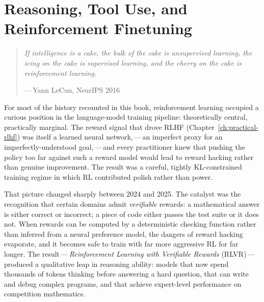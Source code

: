 
\chapter[Reasoning and Reinforcement Finetuning]{Reasoning, Tool Use, and Reinforcement Finetuning}
\label{ch:reasoning}

\begin{quote}
\itshape
If intelligence is a cake, the bulk of the cake is unsupervised learning,
the icing on the cake is supervised learning, and the cherry on the cake
is reinforcement learning.
\par\medskip
\upshape\raggedleft
---\,Yann LeCun, NeurIPS 2016
\end{quote}

\bigskip

For most of the history recounted in this book, reinforcement learning
occupied a curious position in the language-model training pipeline:
theoretically central, practically marginal. The reward signal that
drove RLHF (Chapter~\ref{ch:practical-rlhf}) was itself a
learned neural network,\,---\,an imperfect proxy for an
imperfectly-understood goal,\,---\,and every practitioner knew that pushing the
policy too far against such a reward model would lead to reward
hacking rather than genuine improvement. The result was a careful,
tightly KL-constrained training regime in which RL contributed polish
rather than power.

That picture changed sharply between 2024 and 2025. The catalyst was
the recognition that certain domains admit \emph{verifiable} rewards: a
mathematical answer is either correct or incorrect; a piece of code
either passes the test suite or it does not. When rewards can be
computed by a deterministic checking function rather than inferred from
a neural preference model, the dangers of reward hacking evaporate,
and it becomes safe to train with far more aggressive RL for far longer.
The result\,---\,\emph{Reinforcement Learning with Verifiable
Rewards} (RLVR)\,---\,produced a qualitative leap in
reasoning ability: models that now spend thousands of tokens thinking
before answering a hard question, that can write and debug complex
programs, and that achieve expert-level performance on competition
mathematics.

